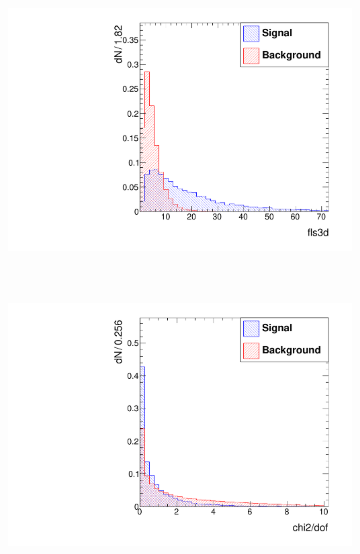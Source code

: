 \documentclass[10pt,a4paper]{article}
\begin{document}
\begin{figure}
\begin{subfigure}[b]{0.2\textwidth}
                \centering
                \includegraphics[width=\textwidth]{Figures/fls3d_endcaps}
                \label{fig:fls3dEndcaps}
        \end{subfigure}
        ~
        \begin{subfigure}[b]{0.2\textwidth}
                \centering
                \includegraphics[width=\textwidth]{Figures/chi2dof_endcaps}
                \label{fig:chi2dofEndcaps}
        \end{subfigure}
        

\end{figure}
\end{document}
